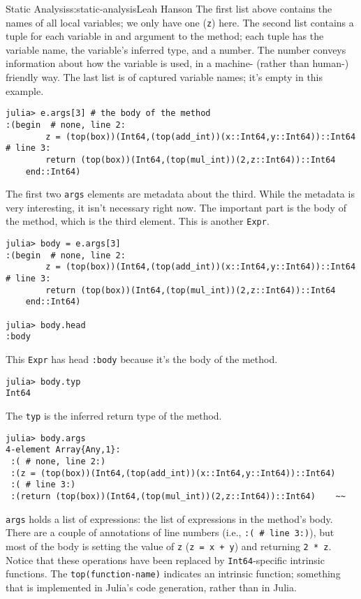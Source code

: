 \begin{aosachapter}{Static Analysis}{s:static-analysis}{Leah Hanson}
The first list above contains the names of all local variables; we only
have one (\texttt{z}) here. The second list contains a tuple for each
variable in and argument to the method; each tuple has the variable
name, the variable's inferred type, and a number. The number conveys
information about how the variable is used, in a machine- (rather than
human-) friendly way. The last list is of captured variable names; it's
empty in this example.

\begin{verbatim}
julia> e.args[3] # the body of the method
:(begin  # none, line 2:
        z = (top(box))(Int64,(top(add_int))(x::Int64,y::Int64))::Int64 # line 3:
        return (top(box))(Int64,(top(mul_int))(2,z::Int64))::Int64
    end::Int64)
\end{verbatim}

The first two \texttt{args} elements are metadata about the third. While
the metadata is very interesting, it isn't necessary right now. The
important part is the body of the method, which is the third element.
This is another \texttt{Expr}.

\begin{verbatim}
julia> body = e.args[3]
:(begin  # none, line 2:
        z = (top(box))(Int64,(top(add_int))(x::Int64,y::Int64))::Int64 # line 3:
        return (top(box))(Int64,(top(mul_int))(2,z::Int64))::Int64
    end::Int64)

julia> body.head
:body
\end{verbatim}

This \texttt{Expr} has head \texttt{:body} because it's the body of the
method.

\begin{verbatim}
julia> body.typ
Int64
\end{verbatim}

The \texttt{typ} is the inferred return type of the method.

\begin{verbatim}
julia> body.args
4-element Array{Any,1}:
 :( # none, line 2:)                                              
 :(z = (top(box))(Int64,(top(add_int))(x::Int64,y::Int64))::Int64)
 :( # line 3:)                                                    
 :(return (top(box))(Int64,(top(mul_int))(2,z::Int64))::Int64)    ~~
\end{verbatim}

\texttt{args} holds a list of expressions: the list of expressions in
the method's body. There are a couple of annotations of line numbers
(i.e., \texttt{:( \# line 3:)}), but most of the body is setting the
value of \texttt{z} (\texttt{z = x + y}) and returning \texttt{2 * z}.
Notice that these operations have been replaced by
\texttt{Int64}-specific intrinsic functions. The
\texttt{top(function-name)} indicates an intrinsic function; something
that is implemented in Julia's code generation, rather than in Julia.


\end{aosachapter}
